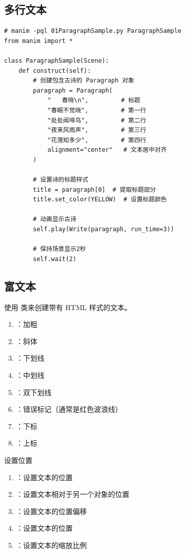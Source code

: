 \subsection{多行文本}
\label{subsec:manim_text_formula_text_paragraph}
\begin{lstlisting}[style=pythonstyle]
# manim -pql 01ParagraphSample.py ParagraphSample
from manim import *

class ParagraphSample(Scene):
    def construct(self):
        # 创建包含古诗的 Paragraph 对象
        paragraph = Paragraph(
            "   春晓\n",         # 标题
            "春眠不觉晓",         # 第一行
            "处处闻啼鸟",         # 第二行
            "夜来风雨声",         # 第三行
            "花落知多少",         # 第四行
            alignment="center"   # 文本居中对齐
        )

        # 设置诗的标题样式
        title = paragraph[0]  # 提取标题部分
        title.set_color(YELLOW)  # 设置标题颜色

        # 动画显示古诗
        self.play(Write(paragraph, run_time=3))
        
        # 保持场景显示2秒
        self.wait(2)
\end{lstlisting}        

\subsection{富文本}
\label{subsec:manim_text_formula_text_markup}
使用  类来创建带有 HTML 样式的文本。
\begin{enumerate}[label=\arabic*)]
    \item {}：加粗
    \item {}：斜体
    \item {}：下划线
    \item {}：中划线
    \item {}：双下划线
    \item {}：错误标记（通常是红色波浪线）
    \item {}：下标
    \item {}：上标
\end{enumerate}

设置位置
\begin{enumerate}[label=\arabic*)]
    \item {}：设置文本的位置
    \item {}：设置文本相对于另一个对象的位置
    \item {}：设置文本的位置偏移
    \item {}：设置文本的位置
    \item {}：设置文本的缩放比例
\end{enumerate}

